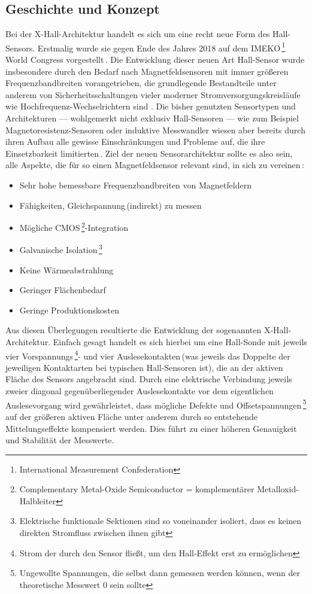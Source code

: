 \documentclass[12pt, a4paper]{article}
\begin{document}
\subsection{Geschichte und Konzept}
Bei der X-Hall-Architektur handelt es sich um eine recht neue Form des Hall-Sensors. Erstmalig wurde sie gegen Ende des Jahres 2018 auf dem IMEKO\,\footnote{International Measurement Confederation} 
World Congress vorgestellt\,\cite{cres19}. \newline
Die Entwicklung dieser neuen Art Hall-Sensor wurde insbesondere durch den Bedarf nach Magnetfeldsensoren mit immer größeren Frequenzbandbreiten vorangetrieben, die grundlegende Bestandteile unter anderem von Sicherheitsschaltungen vieler moderner Stromversorgungskreisläufe wie Hochfrequenz-Wechselrichtern sind\,\cite{cres18}\,\cite{cres21}. Die bisher genutzten Sensortypen und Architekturen --- wohlgemerkt nicht exklusiv Hall-Sensoren --- wie zum Beispiel Magnetoresistenz-Sensoren oder induktive Messwandler wiesen aber bereits durch ihren Aufbau alle gewisse Einschränkungen und Probleme auf, die ihre Einsetzbarkeit limitierten\,\cite{cres21}. \newline
Ziel der neuen Sensorarchitektur sollte es also sein, alle Aspekte, die für so einen Magnetfeldsensor relevant sind, in sich zu vereinen\,\cite{cres19}: 
\begin{itemize}
	\item Sehr hohe bemessbare Frequenzbandbreiten von Magnetfeldern %
	\item Fähigkeiten, Gleichspannung\,(indirekt) zu messen
	\item Mögliche CMOS\,\footnote{Complementary Metal-Oxide Semiconductor = komplementärer Metalloxid-Halbleiter}-Integration
	\item Galvanische Isolation\,\footnote{Elektrische funktionale Sektionen sind so voneinander isoliert, dass es keinen direkten Stromfluss zwischen ihnen gibt}
	\item Keine Wärmeabstrahlung
	\item Geringer Flächenbedarf %
	\item Geringe Produktionskosten
\end{itemize} 
Aus diesen Überlegungen resultierte die Entwicklung der sogenannten X-Hall-Architektur.\newline
Einfach gesagt handelt es sich hierbei um eine Hall-Sonde mit jeweils vier Vorspannungs\,\footnote{Strom der durch den Sensor fließt, um den Hall-Effekt erst zu ermöglichen}- und vier Auslesekontakten\,(was jeweils das Doppelte der jeweiligen Kontaktarten bei typischen Hall-Sensoren ist), die an der aktiven Fläche des Sensors angebracht sind. Durch eine elektrische Verbindung jeweils zweier diagonal gegenüberliegender Auslesekontakte vor dem eigentlichen Auslesevorgang wird gewährleistet, dass mögliche Defekte und Offsetspannungen\,\footnote{Ungewollte Spannungen, die selbst dann gemessen werden können, wenn der theoretische Messwert 0 sein sollte} auf der größeren aktiven Fläche unter anderem durch so entstehende Mittelungseffekte kompensiert werden. Dies führt zu einer höheren Genauigkeit und Stabilität der Messwerte.
\end{document}
